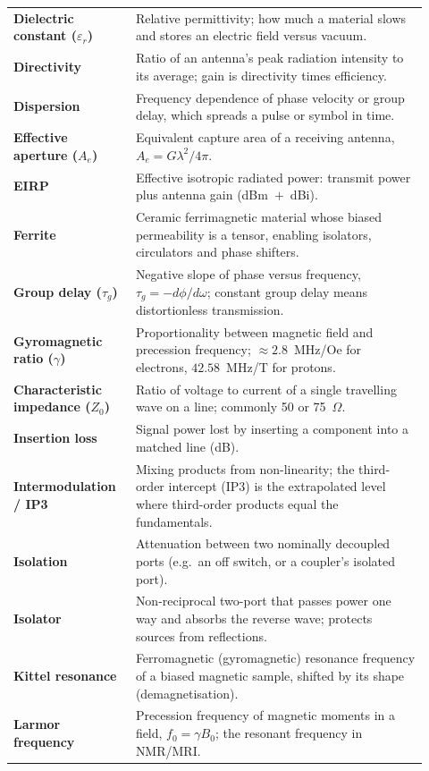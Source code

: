 \begin{longtable}{>{\raggedright\arraybackslash}p{0.26\linewidth}>{\raggedright\arraybackslash}p{0.66\linewidth}}
\textbf{Dielectric constant ($\varepsilon_r$)} & Relative permittivity; how much a material slows and stores an electric field versus vacuum. \\
\textbf{Directivity} & Ratio of an antenna's peak radiation intensity to its average; gain is directivity times efficiency. \\
\textbf{Dispersion} & Frequency dependence of phase velocity or group delay, which spreads a pulse or symbol in time. \\
\textbf{Effective aperture ($A_e$)} & Equivalent capture area of a receiving antenna, $A_e=G\lambda^2/4\pi$. \\
\textbf{EIRP} & Effective isotropic radiated power: transmit power plus antenna gain (dBm~$+$~dBi). \\
\textbf{Ferrite} & Ceramic ferrimagnetic material whose biased permeability is a tensor, enabling isolators, circulators and phase shifters. \\
\textbf{Group delay ($\tau_g$)} & Negative slope of phase versus frequency, $\tau_g=-d\phi/d\omega$; constant group delay means distortionless transmission. \\
\textbf{Gyromagnetic ratio ($\gamma$)} & Proportionality between magnetic field and precession frequency; $\approx 2.8$~MHz/Oe for electrons, $42.58$~MHz/T for protons. \\
\textbf{Characteristic impedance ($Z_0$)} & Ratio of voltage to current of a single travelling wave on a line; commonly 50 or 75~$\Omega$. \\
\textbf{Insertion loss} & Signal power lost by inserting a component into a matched line (dB). \\
\textbf{Intermodulation / IP3} & Mixing products from non-linearity; the third-order intercept (IP3) is the extrapolated level where third-order products equal the fundamentals. \\
\textbf{Isolation} & Attenuation between two nominally decoupled ports (e.g.\ an off switch, or a coupler's isolated port). \\
\textbf{Isolator} & Non-reciprocal two-port that passes power one way and absorbs the reverse wave; protects sources from reflections. \\
\textbf{Kittel resonance} & Ferromagnetic (gyromagnetic) resonance frequency of a biased magnetic sample, shifted by its shape (demagnetisation). \\
\textbf{Larmor frequency} & Precession frequency of magnetic moments in a field, $f_0=\gamma B_0$; the resonant frequency in NMR/MRI. \\

\end{longtable}
